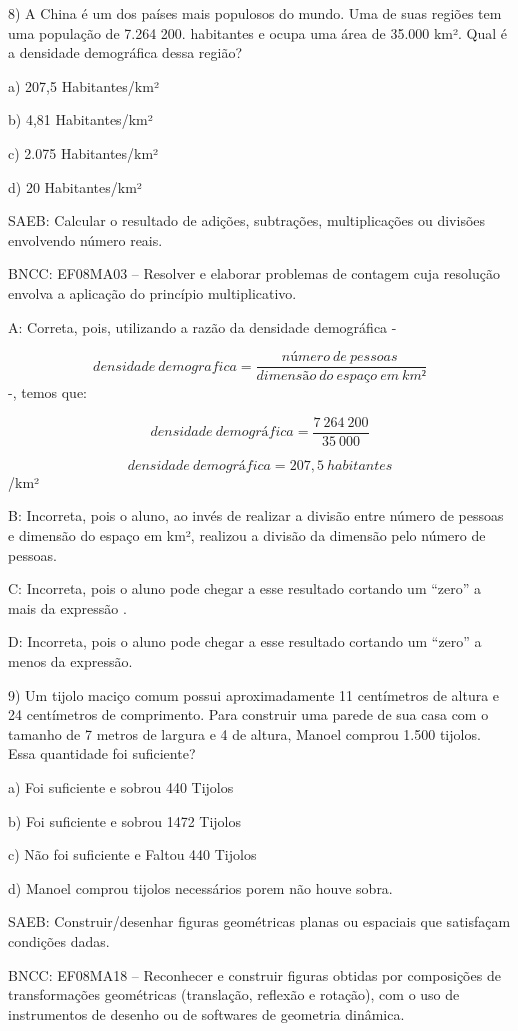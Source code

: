 8) A China é um dos países mais populosos do mundo. Uma de suas regiões
tem uma população de 7.264 200. habitantes e ocupa uma área de 35.000
km². Qual é a densidade demográfica dessa região?

a) 207,5 Habitantes/km²

b) 4,81 Habitantes/km²

c) 2.075 Habitantes/km²

d) 20 Habitantes/km²

SAEB: Calcular o resultado de adições, subtrações, multiplicações ou
divisões envolvendo número reais.

BNCC: EF08MA03 -- Resolver e elaborar problemas de contagem cuja
resolução envolva a aplicação do princípio multiplicativo.

A: Correta, pois, utilizando a razão da densidade demográfica -

\[densidade\ demografica = \frac{número\ de\ pessoas\ }{dimensão\ do\ espaço\ em\ km²}\]
-, temos que:

\[densidade\ demográfica = \frac{7\ 264\ 200}{35\ 000}\]

\[densidade\ demográfica = 207,5\ habitantes\]/km²

B: Incorreta, pois o aluno, ao invés de realizar a divisão entre número
de pessoas e dimensão do espaço em km², realizou a divisão da dimensão
pelo número de pessoas.

C: Incorreta, pois o aluno pode chegar a esse resultado cortando um
``zero'' a mais da expressão .

D: Incorreta, pois o aluno pode chegar a esse resultado cortando um
``zero'' a menos da expressão.

9) Um tijolo maciço comum possui aproximadamente 11 centímetros de
altura e 24 centímetros de comprimento. Para construir uma parede de sua
casa com o tamanho de 7 metros de largura e 4 de altura, Manoel comprou
1.500 tijolos. Essa quantidade foi suficiente?

a) Foi suficiente e sobrou 440 Tijolos

b) Foi suficiente e sobrou 1472 Tijolos

c) Não foi suficiente e Faltou 440 Tijolos

d) Manoel comprou tijolos necessários porem não houve sobra.

SAEB: Construir/desenhar figuras geométricas planas ou espaciais que
satisfaçam condições dadas.

BNCC: EF08MA18 -- Reconhecer e construir figuras obtidas por composições
de transformações geométricas (translação, reflexão e rotação), com o
uso de instrumentos de desenho ou de softwares de geometria dinâmica.

